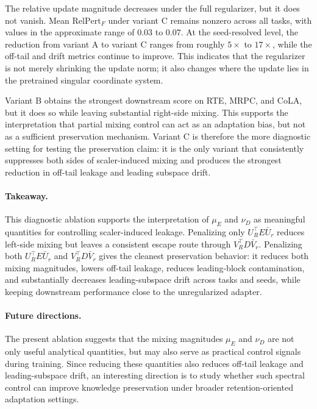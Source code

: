 \documentclass{article}
\begin{document}
The relative update magnitude decreases under the full regularizer, but it
does not vanish. Mean \(\mathrm{RelPert}_F\) under variant C remains nonzero
across all tasks, with values in the approximate range of \(0.03\) to \(0.07\).
At the seed-resolved level, the reduction from variant A to variant C ranges
from roughly \(5\times\) to \(17\times\), while the off-tail and drift metrics
continue to improve. This indicates that the regularizer is not merely
shrinking the update norm; it also changes where the update lies in the
pretrained singular coordinate system.

Variant B obtains the strongest downstream score on RTE, MRPC, and CoLA, but
it does so while leaving substantial right-side mixing. This supports the
interpretation that partial mixing control can act as an adaptation bias, but
not as a sufficient preservation mechanism. Variant C is therefore the more
diagnostic setting for testing the preservation claim: it is the only variant
that consistently suppresses both sides of scaler-induced mixing and produces
the strongest reduction in off-tail leakage and leading subspace drift.

\paragraph{Takeaway.}
This diagnostic ablation supports the interpretation of \(\mu_E\) and
\(\nu_D\) as meaningful quantities for controlling scaler-induced leakage.
Penalizing only \(U_R^\top E\bar{U}_r\) reduces left-side mixing but leaves a
consistent escape route through \(V_R^\top D\bar{V}_r\). Penalizing both
\(U_R^\top E\bar{U}_r\) and \(V_R^\top D\bar{V}_r\) gives the cleanest
preservation behavior: it reduces both mixing magnitudes, lowers off-tail
leakage, reduces leading-block contamination, and substantially decreases
leading-subspace drift across tasks and seeds, while keeping downstream
performance close to the unregularized adapter.

\paragraph{Future directions.}
The present ablation suggests that the mixing magnitudes \(\mu_E\) and
\(\nu_D\) are not only useful analytical quantities, but may also serve as
practical control signals during training. Since reducing these quantities also
reduces off-tail leakage and leading-subspace drift, an interesting direction
is to study whether such spectral control can improve knowledge preservation
under broader retention-oriented adaptation settings.
\end{document}
